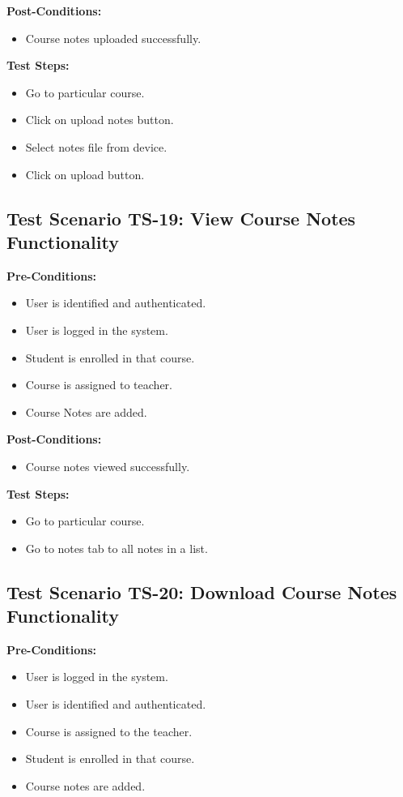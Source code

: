 \textbf{Post-Conditions: }
\begin{itemize}

\item Course notes uploaded successfully.

\end{itemize}
\textbf{Test Steps:}
\begin{itemize}

\item Go to particular course.
\item Click on upload notes button.
\item Select notes file from device.
\item Click on upload button.

\end{itemize}



\subsection{Test Scenario TS-19: View Course Notes Functionality}
\textbf{Pre-Conditions: }
\begin{itemize}

\item User is identified and authenticated.
\item User is logged in the system.
\item Student is enrolled in that course.
\item Course is assigned to teacher.
\item Course Notes are added.

\end{itemize}

\textbf{Post-Conditions: }
\begin{itemize}

\item Course notes viewed successfully.

\end{itemize}
\textbf{Test Steps:}
\begin{itemize}

\item Go to particular course.
\item Go to notes tab to all notes in a list.

\end{itemize}


\subsection{Test Scenario TS-20: Download Course Notes Functionality}
\textbf{Pre-Conditions: }
\begin{itemize}

\item User is logged in the system.
\item User is identified and authenticated.
\item Course is assigned to the teacher.
\item Student is enrolled in that course.
\item Course notes are added.

\end{itemize}

